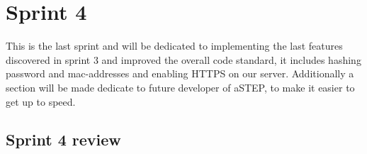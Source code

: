 \chapter{Sprint 4}
This is the last sprint and will be dedicated to implementing the last features discovered in sprint 3 and improved the overall code standard, it includes hashing password and mac-addresses and enabling HTTPS on our server. Additionally a section will be made dedicate to future developer of aSTEP, to make it easier to get up to speed.







\section{Sprint 4 review}